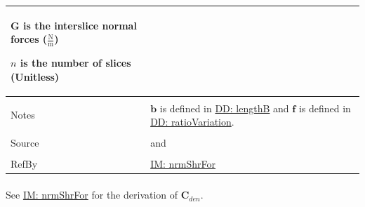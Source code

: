 \documentclass[12pt]{article}
\begin{document}
\begin{minipage}{\textwidth}
\begin{tabular}{>{\raggedright}p{}>{\raggedright\arraybackslash}p{}}
\begin{symbDescription}
                        \item{$\mathbf{G}$ is the interslice normal forces ($\frac{\text{N}}{\text{m}}$)}
                        \item{$n$ is the number of slices (Unitless)}
                        \end{symbDescription}
          \\ \midrule \\
          Notes & $\mathbf{b}$ is defined in \hyperref[DD:lengthB]{DD: lengthB} and $\mathbf{f}$ is defined in \hyperref[DD:ratioVariation]{DD: ratioVariation}.
          \\ \midrule \\
          Source & \cite{chen2005} and \cite{karchewski2012}
          \\ \midrule \\
          RefBy & \hyperref[IM:nrmShrFor]{IM: nrmShrFor}
          \\ \bottomrule
          \end{tabular}
          \end{minipage}
\paragraph{}
\label{IM:nrmShrForDenDeriv}
See \hyperref[IM:nrmShrFor]{IM: nrmShrFor} for the derivation of ${\mathbf{C}_{den}}$.
\par~
\end{document}
